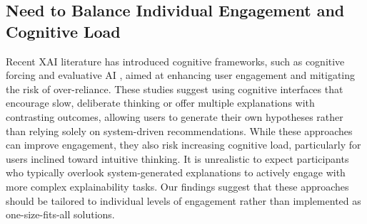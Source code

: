 \subsection{Need to Balance Individual Engagement and Cognitive Load}


Recent XAI literature has introduced cognitive frameworks, such as cognitive forcing \cite{TrustThinkCognitiveForcing} and evaluative AI \cite{miller2023explainable}, aimed at enhancing user engagement and mitigating the risk of over-reliance. These studies suggest using cognitive interfaces that encourage slow, deliberate thinking \cite{kahneman2011thinking} or offer multiple explanations with contrasting outcomes, allowing users to generate their own hypotheses rather than relying solely on system-driven recommendations. While these approaches can improve engagement, they also risk increasing cognitive load, particularly for users inclined toward intuitive thinking. It is unrealistic to expect participants who typically overlook system-generated explanations to actively engage with more complex explainability tasks. Our findings suggest that these approaches should be tailored to individual levels of engagement rather than implemented as one-size-fits-all solutions.


